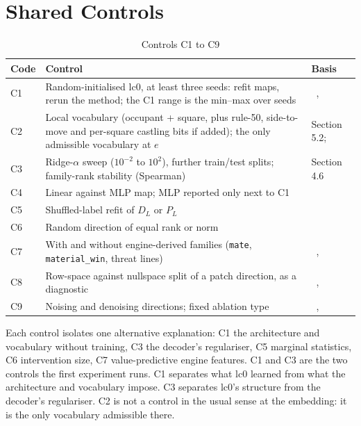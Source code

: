 \documentclass[conference]{IEEEtran}
\begin{document}
\section{Shared Controls}\label{app:B}
\begin{table}[H]
\centering
\renewcommand{\thetable}{B1}
\caption{Controls C1 to C9}
\label{tab:B1}
\small
\begin{tabularx}{\textwidth}{l>{\raggedright\arraybackslash}X>{\raggedright\arraybackslash}p{3.6cm}}
\toprule
Code & Control & Basis \\
\midrule
C1 & Random-initialised lc0, at least three seeds: refit maps, rerun the method; the C1 range is the min--max over seeds & ~\cite{adebayo2018},~\cite{sutter2025} \\
C2 & Local vocabulary (occupant + square, plus rule-50, side-to-move and per-square castling bits if added); the only admissible vocabulary at $e$ & Section 5.2;~\cite{hewitt2019} \\
C3 & Ridge-$\alpha$ sweep ($10^{-2}$ to $10^{2}$), further train/\allowbreak{}test splits; family-rank stability (Spearman) & Section 4.6 \\
C4 & Linear against MLP map; MLP reported only next to C1 & ~\cite{sutter2025} \\
C5 & Shuffled-label refit of $D_L$ or $P_L$ & ~\cite{adebayo2018} \\
C6 & Random direction of equal rank or norm & ~\cite{elazar2021} \\
C7 & With and without engine-derived families (\texttt{mate}, \texttt{material\_\allowbreak{}win}, threat lines) & ~\cite{kumarA2022},~\cite{parisini2026} \\
C8 & Row-space against nullspace split of a patch direction, as a diagnostic & ~\cite{makelov2024},~\cite{wu2024} \\
C9 & Noising and denoising directions; fixed ablation type & ~\cite{heimersheim2024},~\cite{miller2024} \\
\bottomrule
\end{tabularx}
\end{table}

Each control isolates one alternative explanation: C1 the architecture and vocabulary without training, C3 the decoder's regulariser, C5 marginal statistics, C6 intervention size, C7 value-predictive engine features. C1 and C3 are the two controls the first experiment runs. C1 separates what lc0 learned from what the architecture and vocabulary impose. C3 separates lc0's structure from the decoder's regulariser. C2 is not a control in the usual sense at the embedding: it is the only vocabulary admissible there.
\end{document}
